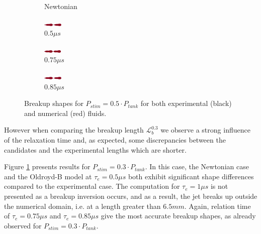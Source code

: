 \documentclass[onecolumn, 12pt]{asme2ej}
\begin{document}
\begin{figure}[]
\begin{subfigure}[t]{1.7cm}
        \caption{Newtonian}
    \end{subfigure}
    \hfill
    \begin{subfigure}[t]{1.6cm}
        \centering
        \includegraphics[angle=-90,origin=c,width=0.9cm]{Figures/Fig15c.eps}
        \caption{$0.5\mu s$}
    \end{subfigure}\hfill
    \begin{subfigure}[t]{1.6cm}
        \centering
        \includegraphics[angle=-90,origin=c,width=0.9cm]{Figures/Fig15d.eps}
        \caption{$0.75\mu s$}
    \end{subfigure}
    \hfill
    \begin{subfigure}[t]{1.6cm}
        \centering
        \includegraphics[angle=-90,origin=c,width=0.9cm]{Figures/Fig15e.eps}
        \caption{$0.85\mu s$}
    \end{subfigure}
    \caption{Breakup shapes for $P_{stim}=0.5\cdot P_{tank}$ for both experimental (black) and numerical (red) fluids.}
    \label{fig:A5}
\end{figure}
However when comparing the breakup length $\mathcal{L}^{0.3}_b$ we observe a strong influence of the relaxation time and, as expected, some discrepancies between the candidates and the experimental lengths which are shorter. 

Figure \ref{fig:A5} presents results for $P_{stim}=0.3\cdot P_{tank}$. In this case, the Newtonian case and the Oldroyd-B model at  $\tau_e = 0.5 \mu s$ both exhibit significant shape differences compared to the experimental case. The computation for  $\tau_e = 1 \mu s$ is not presented as a breakup inversion occurs, and as a result, the jet breaks up outside the numerical domain, i.e. at a length greater than $6.5mm$.
Again, relation time of  $\tau_e = 0.75 \mu s$ and  $\tau_e = 0.85 \mu s$ give the most accurate breakup shapes, as already observed for $P_{stim}=0.3\cdot P_{tank}$.
\end{document}
